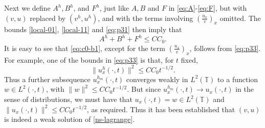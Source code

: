 \documentclass[a4paper,oneside,11pt]{article}
\numberwithin{equation}{section}
\begin{document}
Next we define \(A^{h},B^{h}\), and \(F^{h}\), just like \(A, B\) and \(F\) in \eqref{eq:A}-\eqref{eq:F}, but with \((v,u)\) replaced by \((v^{h},u^h)\), and with the terms involving \(\left(\frac{u_{x}}{v}\right)_{x}\) omitted.
The bounds \eqref{local-01}, \eqref{local-11} and \eqref{eq:p31} then imply that
\begin{equation}\label{eq:p33}
	A^h+B^h+F^h\leq CC_0.
\end{equation}
It is easy to see that \eqref{eq:c0-b1}, except for the term \(\left(\frac{u_{x}}{v}\right)_{x}\), follows from \eqref{eq:p33}. For example, one of the bounds in \eqref{eq:p33} is that, for \(t\) fixed,
\[\|u_x^h(\cdot,t)\|^2\leq CC_0t^{-1/2}.\]
Thus a further subsequence \(u_{x}^{h_m}(\cdot,t)\) converges weakly in \(L^{2}(\mathbb{T})\) to a function \(w\in L^{2}(\cdot,t)\), with \(\|w\|^2\leq CC_0t^{-1/2}\). But since \(u_{x}^{h_m}(\cdot,t)\to u_{x}(\cdot,t)\) in the sense of distributions, we must have that \(u_{x}(\cdot,t)=w\in L^{2}(\mathbb{T})\) and \(\|u_{x}(\cdot,t)\|^{2}\leq CC_{0}t^{-1/2}\), as required. Thus it has been established that \((v,u)\) is indeed a weak solution of \eqref{ns-lagrange}. 
\end{document}
